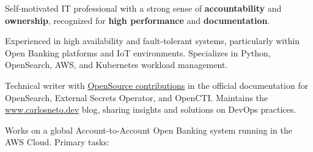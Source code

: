 \documentclass[10pt,a4paper]{altacv}
\begin{document}



\begin{fullwidth}
    \makecvheader
\end{fullwidth}

\bigskip



Self-motivated IT professional with a strong sense of \textbf{accountability} and \textbf{ownership}, recognized for \textbf{high performance} and \textbf{documentation}.

\bigskip

Experienced in high availability and fault-tolerant systems, particularly within Open Banking platforms and IoT environments. Specializes in Python, OpenSearch, AWS, and Kubernetes workload management.

\bigskip

Technical writer with \href{https://carlosneto.dev/whoami/#opensource-contributions}{\uline{OpenSource contributions}} in the official documentation for OpenSearch, External Secrets Operator, and OpenCTI. Maintains the \href{https://www.carlosneto.dev/}{\uline{www.carlosneto.dev}} blog, sharing insights and solutions on DevOps practices.


\bigskip
\bigskip



Works on a global Account-to-Account Open Banking system running in the AWS Cloud. Primary tasks:

\bigskip
\end{document}
